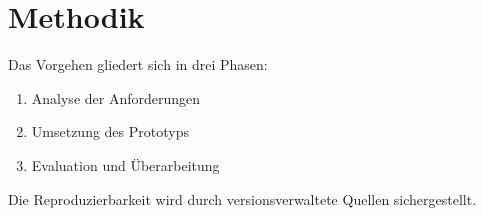 \section{Methodik}
\label{sec:methodik-detail}

Das Vorgehen gliedert sich in drei Phasen:
\begin{enumerate}
  \item Analyse der Anforderungen
  \item Umsetzung des Prototyps
  \item Evaluation und Überarbeitung
\end{enumerate}

Die Reproduzierbarkeit wird durch versionsverwaltete Quellen sichergestellt.

